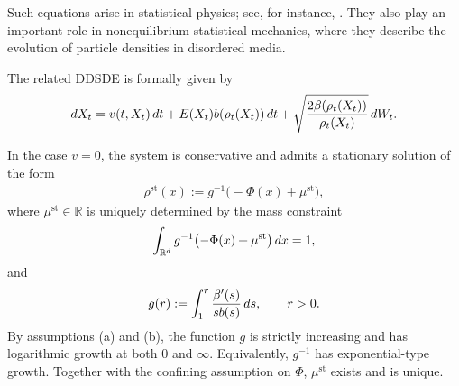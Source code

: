 \documentclass[10pt,a4paper]{amsart}
\numberwithin{equation}{section}
\def\dif{{\mathord{{\rm d}}}}
\def\dif{{\mathord{{\rm d}}}}
\begin{document}
Such equations arise in statistical physics; see, for instance,
\cite{Fra05,FD01,SNC07,Tsa09}. They also play an important role in
nonequilibrium statistical mechanics, where they describe the evolution of
particle densities in disordered media.

The related DDSDE is formally given by
\begin{align}
\dif X_t
=
v(t,X_t)\,\dif t
+
E(X_t)b(\rho_t(X_t))\,\dif t
+
\sqrt{\frac{2\beta(\rho_t(X_t))}{\rho_t(X_t)}}\,\dif W_t .
\label{R:eq:por}
\end{align} 

In the case $v=0$, the system is conservative and admits a stationary solution of the form
\begin{align}
\rho^{\mathrm{st}}(x)
:=
g^{-1}\bigl(-\Phi(x)+\mu^{\mathrm{st}}\bigr),
\label{def:rhost}
\end{align}
where $\mu^{\mathrm{st}}\in\mathbb{R}$ is uniquely determined by the mass
constraint
\begin{align}
\int_{\mathbb{R}^d}
g^{-1}\bigl(-\Phi(x)+\mu^{\mathrm{st}}\bigr)
\,\dif x
=
1 ,\notag
\end{align}
and
\begin{align}
g(r)
:=
\int_1^r
\frac{\beta'(s)}{s b(s)}
\,\dif s,
\qquad
r>0 .\notag
\end{align}
By assumptions \textnormal{(a)} and \textnormal{(b)}, the function $g$ is
strictly increasing and has logarithmic growth at both $0$ and $\infty$.
Equivalently, $g^{-1}$ has exponential-type growth. Together with the
confining assumption on $\Phi$,  $\mu^{\mathrm{st}}$ exists and is unique.  
\end{document}

